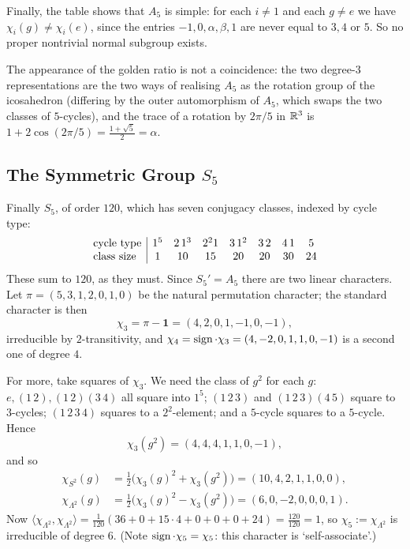 \documentclass[a4paper]{scrartcl}
\newcommand{\ip}[2]{\langle #1, #2 \rangle}
\begin{document}
Finally, the table shows that $A_5$ is simple: for each $i\neq 1$ and each $g\neq e$ we have $\chi_i(g)\neq\chi_i(e)$, since the entries $-1,0,\alpha,\beta,1$ are never equal to $3,4$ or $5$. So no proper nontrivial normal subgroup exists.

\begin{remark}
	The appearance of the golden ratio is not a coincidence: the two degree-$3$ representations are the two ways of realising $A_5$ as the rotation group of the icosahedron (differing by the outer automorphism of $A_5$, which swaps the two classes of $5$-cycles), and the trace of a rotation by $2\pi/5$ in $\mathbb{R}^3$ is $1 + 2\cos(2\pi/5) = \frac{1+\sqrt5}{2} = \alpha$.
\end{remark}

\subsection{The Symmetric Group \texorpdfstring{$S_5$}{S5}}

Finally $S_5$, of order $120$, which has seven conjugacy classes, indexed by cycle type:
$$\setlength{\arraycolsep}{5pt}\begin{array}{l|ccccccc}
\text{cycle type} & 1^5 & 2\,1^3 & 2^2 1 & 3\,1^2 & 3\,2 & 4\,1 & 5\\
\text{class size} & 1 & 10 & 15 & 20 & 20 & 30 & 24
\end{array}$$
These sum to $120$, as they must. Since $S_5' = A_5$ there are two linear characters. Let $\pi = (5,3,1,2,0,1,0)$ be the natural permutation character; the standard character is then
$$\chi_3 = \pi - \mathbf 1 = (4,2,0,1,-1,0,-1),$$
irreducible by $2$-transitivity, and $\chi_4 = \operatorname{sign}\cdot\chi_3 = (4,-2,0,1,1,0,-1)$ is a second one of degree $4$.

For more, take squares of $\chi_3$. We need the class of $g^2$ for each $g$: $e,(1\,2),(1\,2)(3\,4)$ all square into $1^5$; $(1\,2\,3)$ and $(1\,2\,3)(4\,5)$ square to $3$-cycles; $(1\,2\,3\,4)$ squares to a $2^2$-element; and a $5$-cycle squares to a $5$-cycle. Hence
$$\chi_3(g^2) = (4,4,4,1,1,0,-1),$$
and so
\begin{align*}
	\chi_{S^2}(g) &= \tfrac12\big(\chi_3(g)^2+\chi_3(g^2)\big) = (10,4,2,1,1,0,0),\\
	\chi_{\Lambda^2}(g) &= \tfrac12\big(\chi_3(g)^2-\chi_3(g^2)\big) = (6,0,-2,0,0,0,1).
\end{align*}
Now $\ip{\chi_{\Lambda^2}}{\chi_{\Lambda^2}} = \frac1{120}(36 + 0 + 15\cdot4+0+0+0+24) = \frac{120}{120} = 1$, so $\chi_5 := \chi_{\Lambda^2}$ is irreducible of degree $6$. (Note $\operatorname{sign}\cdot\chi_5 = \chi_5$: this character is `self-associate'.)
\end{document}
